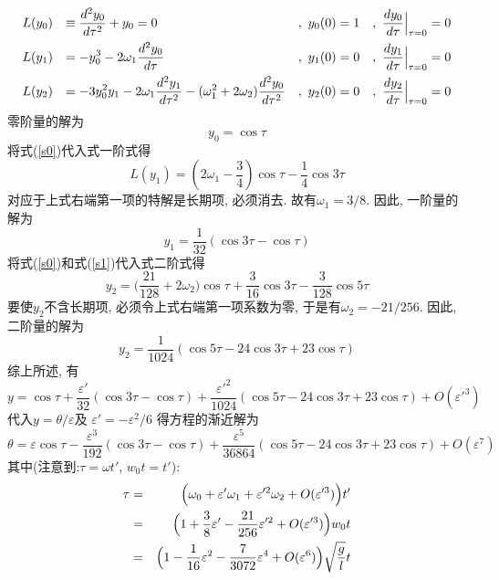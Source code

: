 \begin{solution}
\[
\begin{array}{llll}
\displaystyle L(y_0) &\displaystyle  \equiv \frac{d^2y_0}{d\tau^2} + y_0 = 0&, \displaystyle ~ y_0(0) = 1&, \displaystyle ~ \frac{dy_0}{d\tau}\Big|_{\tau=0} = 0\\
\noalign{\vskip5pt}
\displaystyle L(y_1) &\displaystyle = -y_0^3-2\omega_1\frac{d^2y_0}{d\tau}&, \displaystyle ~ y_1(0) = 0&, \displaystyle ~ \frac{dy_1}{d\tau}\Big|_{\tau=0} = 0\\
\noalign{\vskip5pt}
\displaystyle L(y_2) &\displaystyle =  -3y_0^2y_1 -2\omega_1\frac{d^2y_1}{d\tau^2}-(\omega_1^2+2\omega_2)\frac{d^2y_0}{d\tau^2}&,\displaystyle  ~ y_2(0) = 0&, \displaystyle ~ \frac{dy_2}{d\tau}\Big|_{\tau=0} = 0
\end{array}
\]
零阶量的解为
\begin{equation}\label{s0}
y_0 = \cos\tau
\end{equation}
将式(\ref{s0})代入式一阶式得
\[
L(y_1) = (2\omega_1 - \frac{3}{4})\cos\tau - \frac{1}{4}\cos 3\tau
\]
对应于上式右端第一项的特解是长期项, 必须消去. 故有$\omega_1=3/8$. 因此, 一阶量的解为
\begin{equation}\label{s1}
y_1 = \frac{1}{32}(\cos 3\tau - \cos\tau)
\end{equation}
将式(\ref{s0})和式(\ref{s1})代入式二阶式得
\[
y_2 = \Big(\frac{21}{128}+2\omega_2\Big)\cos\tau + \frac{3}{16}\cos 3\tau - \frac{3}{128} \cos 5\tau
\]
要使$y_2$不含长期项, 必须令上式右端第一项系数为零, 于是有$\omega_2 = -21/256$. 因此, 二阶量的解为
\begin{equation}\label{s2}
y_2 =\frac{1}{1024}(\cos 5\tau - 24\cos 3\tau + 23\cos\tau)
\end{equation}
综上所述, 有
\[
y = \cos\tau + \frac{\varepsilon'}{32}(\cos 3\tau -\cos\tau) + \frac{\varepsilon'^2}{1024}(\cos 5\tau - 24\cos 3\tau + 23\cos \tau) + O(\varepsilon'^3)
\]
代入$y = \theta/\varepsilon$及 $\varepsilon'=-\varepsilon^2/6$ 得方程的渐近解为
\[
\theta = \varepsilon\cos\tau - \frac{\varepsilon^3}{192}(\cos 3\tau -\cos\tau) + \frac{\varepsilon^5}{36864}(\cos 5\tau - 24\cos 3\tau + 23\cos \tau) + O(\varepsilon^7)
\]
其中(注意到:$\tau=\omega t'$, $w_0 t = t'$):
\begin{eqnarray}
\displaystyle \tau &=& \Big(\omega_0 + \varepsilon'\omega_1 + \varepsilon'^2\omega_2 + O(\varepsilon'^3)\Big) t'\nonumber\\
\displaystyle &=& \Big(1 + \frac{3}{8} \varepsilon' - \frac{21}{256} \varepsilon'^2 + O(\varepsilon'^3)\Big) w_0 t\nonumber\\
\displaystyle &=& \Big(1 - \frac{1}{16} \varepsilon^2 - \frac{7}{3072} \varepsilon^4 + O(\varepsilon^6)\Big)\sqrt{\frac{g}{l}} t\nonumber
\end{eqnarray}

\end{solution} 
